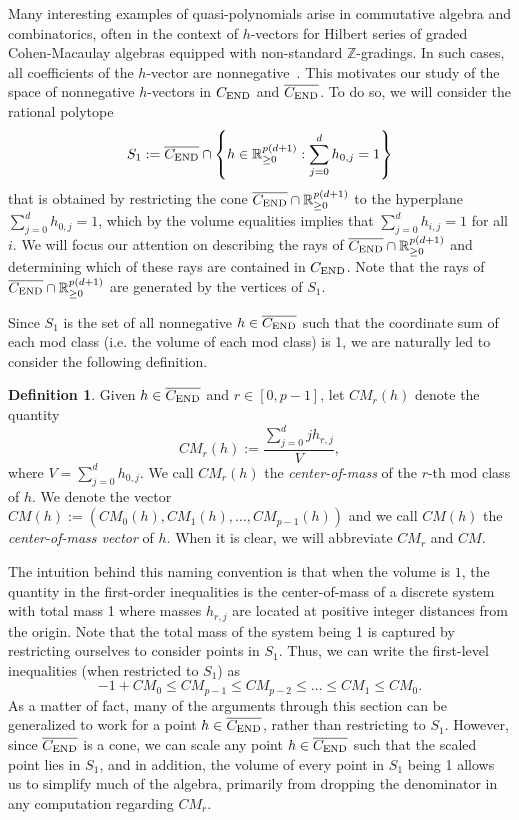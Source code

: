 \documentclass[12pt]{amsart}
\theoremstyle{definition}
\newtheorem{defn}[thm]{Definition}
\numberwithin{equation}{section}
\renewcommand\>{\rangle}
\newcommand\<{\langle}
\newcommand\0{\mathbf{0}}
\newcommand\RR{\mathbb{R}}
\newcommand\ZZ{\mathbb{Z}}
\newcommand{\CEND}{C_\textnormal{END}}
\begin{document}
Many interesting examples of quasi-polynomials arise in commutative algebra and combinatorics, often in the context of $h$-vectors for Hilbert series of graded Cohen-Macaulay algebras equipped with non-standard $\ZZ$-gradings.
In such cases, all coefficients of the $h$-vector are nonnegative~\cite{brunsherzog}.
This motivates our study of the space of nonnegative $h$-vectors in $\CEND$ and $\overline{\CEND}$.
To do so, we will consider the rational polytope
\[
S_1 :=  \overline{\CEND} \cap \left\{h \in \RR_{\geq 0}^{p(d+1)} : \sum_{j=0}^d h_{0,j} = 1\right\} 
\]
that is obtained by restricting the cone $ \overline{\CEND}\cap \RR_{\geq 0}^{p(d+1)}$ to the hyperplane $\sum_{j=0}^d h_{0,j} = 1$, which by the volume equalities implies that $\sum_{j=0}^d h_{i,j} = 1$ for all $i$.
We will focus our attention on describing the rays of $\overline{\CEND}\cap \RR_{\geq 0}^{p(d+1)}$ and determining which of these rays are contained in $\CEND$. 
Note that the rays of $ \overline{\CEND}\cap \RR_{\geq 0}^{p(d+1)}$ are generated by the vertices of $S_1$.

Since $S_1$ is the set of all nonnegative $h \in \overline{\CEND}$ such that the coordinate sum of each mod class (i.e. the volume of each mod class) is 1, we are naturally led to consider the following definition.

\begin{defn}\label{d:CM}
	Given $h \in \overline{\CEND}$ and $r \in [0,p-1]$, let $CM_r(h)$ denote the quantity
	\[CM_r(h) := \frac{\sum_{j = 0}^d j  h_{r,j}}{V},\]
	where $V = \sum_{j = 0}^d h_{0,j}$.
	We call $CM_r(h)$ the \emph{center-of-mass} of the $r$-th mod class of $h$.
	We denote the vector $CM(h) := (CM_0(h), CM_1(h), \dots, CM_{p-1}(h))$ and we call $CM(h)$ the \emph{center-of-mass vector} of $h$.
	When it is clear, we will abbreviate $CM_r$ and $CM$.
\end{defn}

The intuition behind this naming convention is that when the volume is $1$, the quantity in the first-order inequalities is the center-of-mass of a discrete system with total mass 1 where masses $h_{r,j}$ are located at positive integer distances from the origin. 
Note that the total mass of the system being 1 is captured by restricting ourselves to consider points in $S_1$.
Thus, we can write the first-level inequalities (when restricted to $S_1$) as
\begin{equation}\label{eq:first_order_CM}
	-1 + CM_0 \leq CM_{p-1} \leq CM_{p-2} \leq \dots \leq CM_1 \leq CM_0.
\end{equation}
As a matter of fact, many of the arguments through this section can be generalized to work for a point $h \in \overline{\CEND}$, rather than restricting to $S_1$. However, since $\overline{\CEND}$ is a cone, we can scale any point $h \in \overline{\CEND}$ such that the scaled point lies in $S_1$, and in addition, the volume of every point in $S_1$ being 1 allows us to simplify  much of the algebra, primarily from dropping the denominator in any computation regarding $CM_r$.
\end{document}
